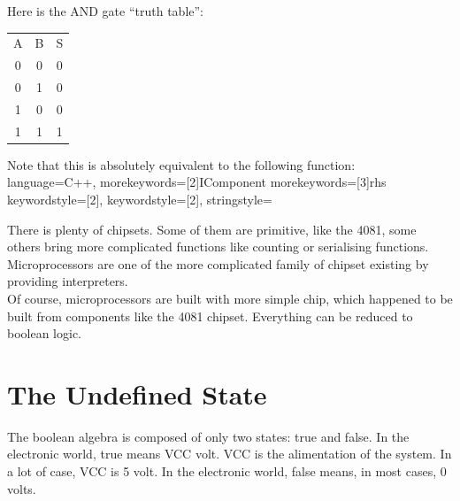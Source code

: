 \documentclass{koala-en}
\begin{document}
  Here is the AND gate ``truth table'':

  \begin{center}
    \begin{tabular}{ccc}
      A & B & S\\
      0 & 0 & 0\\
      0 & 1 & 0\\
      1 & 0 & 0\\
      1 & 1 & 1\\
    \end{tabular}
  \end{center}

  Note that this is absolutely equivalent to the following function:\\
  \lstset
    {
      language=C++,
      morekeywords=[2]{IComponent}
      morekeywords=[3]{rhs}
      keywordstyle=[2]\color{nicergreen}\ttfamily,
      keywordstyle=[2]\color{nicerorange}\ttfamily,
      stringstyle=\color{nicergreen}\ttfamily
    }
  
    
  There is plenty of chipsets. Some of them are primitive, like the 4081,
  some others bring more complicated functions like counting or serialising
  functions. Microprocessors are one of the more complicated family of chipset
  existing by providing interpreters.\\

  Of course, microprocessors are built with more simple chip, which happened
  to be built from components like the 4081 chipset. Everything can be reduced
  to boolean logic.\\

\chapter{The Undefined State}

The boolean algebra is composed of only two states: true and false. In the
electronic world, true means VCC volt. VCC is the alimentation of the system.
In a lot of case, VCC is 5 volt. In the electronic world, false means, in
most cases, 0 volts.\\
\end{document}
